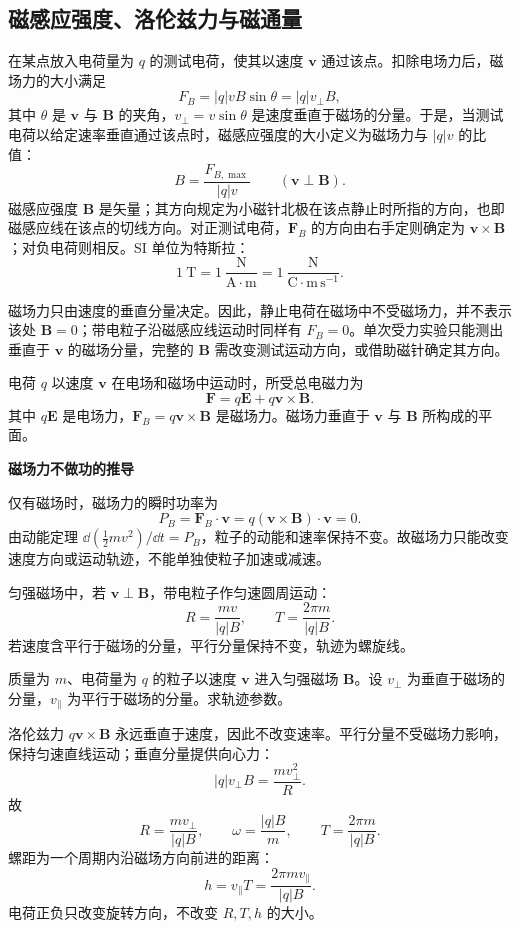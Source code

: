 \subsection{磁感应强度、洛伦兹力与磁通量}

\begin{definition}[磁感应强度]\label{def:magnetic-induction-definition}
在某点放入电荷量为 $q$ 的测试电荷，使其以速度 $\bm v$ 通过该点。扣除电场力后，磁场力的大小满足
\[
  F_B=|q|vB\sin\theta=|q|v_\perp B,
\]
其中 $\theta$ 是 $\bm v$ 与 $\bm B$ 的夹角，$v_\perp=v\sin\theta$ 是速度垂直于磁场的分量。于是，当测试电荷以给定速率垂直通过该点时，磁感应强度的大小定义为磁场力与 $|q|v$ 的比值：
\[
  B=\frac{F_{B,\max}}{|q|v}\qquad(\bm v\perp\bm B).
\]
磁感应强度 $\bm B$ 是矢量；其方向规定为小磁针北极在该点静止时所指的方向，也即磁感应线在该点的切线方向。对正测试电荷，$\bm F_B$ 的方向由右手定则确定为 $\bm v\times\bm B$；对负电荷则相反。SI 单位为特斯拉：
\[
  1\ \mathrm T=1\ \frac{\mathrm N}{\mathrm A\cdot\mathrm m}
  =1\ \frac{\mathrm N}{\mathrm C\cdot\mathrm{m}\,\mathrm{s}^{-1}}.
\]
\end{definition}

磁场力只由速度的垂直分量决定。因此，静止电荷在磁场中不受磁场力，并不表示该处 $\bm B=0$；带电粒子沿磁感应线运动时同样有 $F_B=0$。单次受力实验只能测出垂直于 $\bm v$ 的磁场分量，完整的 $\bm B$ 需改变测试运动方向，或借助磁针确定其方向。

\begin{theorem}[洛伦兹力]\label{thm:lorentz-force}
电荷 $q$ 以速度 $\bm v$ 在电场和磁场中运动时，所受总电磁力为
\[
  \bm F=q\bm E+q\bm v\times\bm B.
\]
其中 $q\bm E$ 是电场力，$\bm F_B=q\bm v\times\bm B$ 是磁场力。磁场力垂直于 $\bm v$ 与 $\bm B$ 所构成的平面。
\end{theorem}

\textbf{磁场力不做功的推导}

仅有磁场时，磁场力的瞬时功率为
\[
  P_B=\bm F_B\cdot\bm v
  =q(\bm v\times\bm B)\cdot\bm v=0.
\]
由动能定理 $\dd(\frac12mv^2)/\dd t=P_B$，粒子的动能和速率保持不变。故磁场力只能改变速度方向或运动轨迹，不能单独使粒子加速或减速。

匀强磁场中，若 $\bm v\perp\bm B$，带电粒子作匀速圆周运动：
\[
  R=\frac{mv}{|q|B},\qquad T=\frac{2\pi m}{|q|B}.
\]
若速度含平行于磁场的分量，平行分量保持不变，轨迹为螺旋线。

\begin{example}[title={带电粒子在匀强磁场中的螺旋运动}]\label{eg:helical-motion}
质量为 $m$、电荷量为 $q$ 的粒子以速度 $\bm v$ 进入匀强磁场 $\bm B$。设 $v_\perp$ 为垂直于磁场的分量，$v_\parallel$ 为平行于磁场的分量。求轨迹参数。
\begin{solution}
洛伦兹力 $q\bm v\times\bm B$ 永远垂直于速度，因此不改变速率。平行分量不受磁场力影响，保持匀速直线运动；垂直分量提供向心力：
\[
  |q|v_\perp B=\frac{m v_\perp^2}{R}.
\]
故
\[
  R=\frac{m v_\perp}{|q|B},\qquad
  \omega=\frac{|q|B}{m},\qquad
  T=\frac{2\pi m}{|q|B}.
\]
螺距为一个周期内沿磁场方向前进的距离：
\[
  h=v_\parallel T=\frac{2\pi m v_\parallel}{|q|B}.
\]
电荷正负只改变旋转方向，不改变 $R,T,h$ 的大小。
\end{solution}
\end{example}

